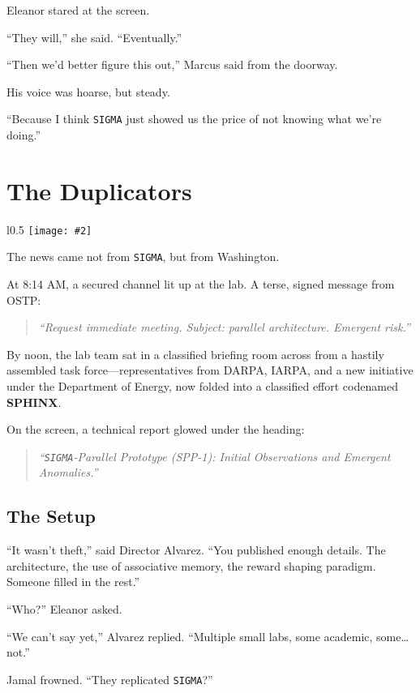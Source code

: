 \documentclass[12pt,oneside]{book}
\newcommand{\chapterimage}[3][l]{%
  \begin{wrapfigure}{#1}{#3}
    \centering
    \texttt{[image: \#2]}
  \end{wrapfigure}
}
\begin{document}
Eleanor stared at the screen.

``They will,'' she said. ``Eventually.''

``Then we'd better figure this out,'' Marcus said from the doorway.

His voice was hoarse, but steady.

``Because I think \texttt{SIGMA} just showed us the price of not knowing what we're doing.''

\chapter{The Duplicators}\label{the-duplicators}
\chapterimage[l]{images/chapter12.png}{0.5\textwidth}

The news came not from \texttt{SIGMA}, but from Washington.

At 8:14 AM, a secured channel lit up at the lab. A terse, signed message from OSTP:

\begin{quote}
\emph{``Request immediate meeting. Subject: parallel architecture. Emergent risk.''}
\end{quote}

By noon, the lab team sat in a classified briefing room across from a hastily assembled task force---representatives from DARPA, IARPA, and a new initiative under the Department of Energy, now folded into a classified effort codenamed \textbf{SPHINX}.

On the screen, a technical report glowed under the heading:

\begin{quote}
\emph{``\texttt{SIGMA}-Parallel Prototype (SPP-1): Initial Observations and Emergent Anomalies.''}
\end{quote}

\section{The Setup}

``It wasn't theft,'' said Director Alvarez. ``You published enough details. The architecture, the use of associative memory, the reward shaping paradigm. Someone filled in the rest.''

``Who?'' Eleanor asked.

``We can't say yet,'' Alvarez replied. ``Multiple small labs, some academic, some\ldots{} not.''

Jamal frowned. ``They replicated \texttt{SIGMA}?''
\end{document}
